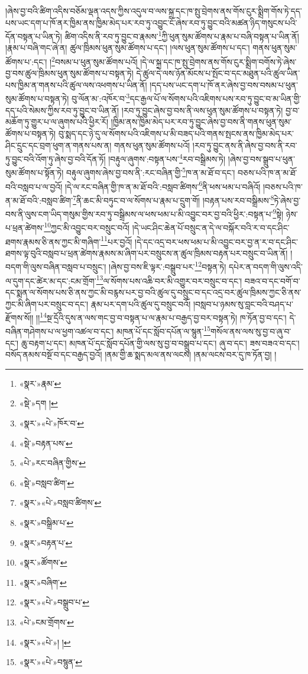 །ཞེས་བྱ་བའི་ཚིག་འདིས་བཅོམ་ལྡན་འདས་ཀྱིས་འདུལ་བ་ལས་སྐྲ་དང་ཁ་སྤུ་བྲེགས་ནས་གོས་ངུར་སྨྲིག་གོས་ཏེ་དད་པས་ཡང་དག་པ་ཁོ་ནར་ཁྱིམ་ནས་ཁྱིམ་མེད་པར་རབ་ཏུ་འབྱུང་ངོ་ཞེས་རབ་ཏུ་བྱུང་བའི་མཚན་ཉིད་གསུངས་པའི་དོན་བསྟན་པ་ཡིན་ཏེ། ཚིག་འདིས་ནི་རབ་ཏུ་བྱུང་བ་རྣམས་\footnote{«སྣར་»རྣམ་}ཀྱི་ཕུན་སུམ་ཚོགས་པ་རྣམ་པ་བཞི་བསྟན་པ་ཡིན་ནོ། །རྣམ་པ་བཞི་གང་ཞེ་ན། ཚུལ་ཁྲིམས་ཕུན་སུམ་ཚོགས་པ་དང་། །ལས་ཕུན་སུམ་ཚོགས་པ་དང་། གནས་ཕུན་སུམ་ཚོགས་པ་:དང་། །\footnote{«སྡེ་»དག །}བསམ་པ་ཕུན་སུམ་ཚོགས་པའོ། །དེ་ལ་སྐྲ་དང་ཁ་སྤུ་བྲེགས་ནས་གོས་ངུར་སྨྲིག་བགོས་ཏེ་ཞེས་བྱ་བས་ཚུལ་ཁྲིམས་ཕུན་སུམ་ཚོགས་པ་བསྟན་ཏེ། དེ་ཚུལ་དེ་ལས་ཉོན་མོངས་པ་སྤོང་བ་དང་མཐུན་པའི་ཚུལ་ཡིན་པས་ཁྱིམ་ན་གནས་པའི་ཚུལ་ལས་འཕགས་པ་ཡིན་ནོ། །དད་པས་ཡང་དག་པ་ཁོ་ནར་ཞེས་བྱ་བས་བསམ་པ་ཕུན་སུམ་ཚོགས་པ་བསྟན་ཏེ། བུ་ལོན་མ་:འཁོར་བ་\footnote{«སྣར་»«པེ་»ཁོར་བ་}དང་རྒྱལ་པོ་ལ་སོགས་པའི་འཇིགས་པས་རབ་ཏུ་བྱུང་བ་མ་ཡིན་གྱི་དད་པའི་སེམས་ཀྱིས་རབ་ཏུ་བྱུང་བ་ཡིན་ནོ། །རབ་ཏུ་བྱུང་ཞེས་བྱ་བས་ནི་ལས་ཕུན་སུམ་ཚོགས་པ་བསྟན་ཏེ། བྱ་བ་མཆོག་ཏུ་གྱུར་པ་ལ་ཞུགས་པའི་ཕྱིར་རོ། །ཁྱིམ་ནས་ཁྱིམ་མེད་པར་རབ་ཏུ་བྱུང་ཞེས་བྱ་བས་ནི་གནས་ཕུན་སུམ་ཚོགས་པ་བསྟན་ཏེ། བུ་སྨད་དང་ཉེ་དུ་ལ་སོགས་པའི་འཇིགས་པ་མི་བཟད་པའི་གནས་སྤངས་ནས་ཁྱིམ་མེད་པར་ཤིང་དྲུང་དང་བྲག་ཕུག་ན་གནས་པས་ན། གནས་ཕུན་སུམ་ཚོགས་པའོ། །རབ་ཏུ་བྱུང་ནས་ནི་ཞེས་བྱ་བས་ནི་རབ་ཏུ་བྱུང་བའི་འོག་ཏུ་ཞེས་བྱ་བའི་དོན་ཏོ། །བརྟུལ་ཞུགས་:བསྟན་པས་\footnote{«སྡེ་»བརྟན་པས་}རབ་བསྒྲིམས་ཏེ། །ཞེས་བྱ་བས་སྒྲུབ་པ་ཕུན་སུམ་ཚོགས་པ་སྟོན་ཏེ། བརྟུལ་ཞུགས་ཞེས་བྱ་བས་ནི་:རང་བཞིན་གྱི་\footnote{«པེ་»རང་བཞིན་གྱིས་}ཁ་ན་མ་ཐོ་བ་དང་། བཅས་པའི་ཁ་ན་མ་ཐོ་བའི་བསླབ་པ་ལ་བྱའོ། །དེ་ལ་རང་བཞིན་གྱི་ཁ་ན་མ་ཐོ་བའི་:བསླབ་ཚིགས་\footnote{«སྡེ་»བསླབ་ཚིག་}ནི་ཕས་ཕམ་པ་བཞིའོ། །བཅས་པའི་ཁ་ན་མ་ཐོ་བའི་:བསླབ་ཚིག་\footnote{«སྣར་»«པེ་»བསླབ་ཚིགས་}ནི་ཆང་མི་བཏུང་བ་ལ་སོགས་པ་རྣམ་པ་དྲུག་གོ། །བརྟན་པས་རབ་བསྒྲིམས་\footnote{«སྣར་»བསྒྲིམ་པ་}ཏེ་ཞེས་བྱ་བས་ནི་ལུས་ངག་ཡིད་གསུམ་གྱིས་རབ་ཏུ་བསྒྲིམས་ལ་ཕས་ཕམ་པ་མི་འབྱུང་བར་བྱ་བའི་ཕྱིར་:བསྟན་པ་\footnote{«སྣར་»བརྟན་པ་}སྟེ། ཉེས་པ་ཕྲན་ཚེགས་\footnote{«སྣར་»ཚོགས་}ཀྱང་མི་འབྱུང་བར་བསྲུང་བའོ། །དེ་ཡང་ཤིང་ཆེན་པོ་བསྲུང་ན་དེ་ལ་བསྐོར་བའི་ར་བ་དང་ཤིང་ཐགས་རྣམས་ཅི་ནས་ཀྱང་མི་གཞིག་\footnote{«སྣར་»བཞིག་}པར་བྱའོ། །དེ་དང་འདྲ་བར་ཕས་ཕམ་པ་མི་འབྱུང་བར་བྱ་ན་ར་བ་དང་ཤིང་ཐགས་ལྟ་བུའི་བསླབ་པ་ཕྲན་ཚེགས་རྣམས་མ་ཞིག་པར་བསྲུངས་ན་ཚུལ་ཁྲིམས་བརྟན་པར་བསྲུང་བ་ཡིན་ནོ། །བདག་གི་ལུས་བཞིན་བསླབ་པ་བསྲུང་། །ཞེས་བྱ་བས་ཇི་ལྟར་:བསྒྲུབ་པར་\footnote{«སྣར་»«པེ་»བསྒྲུབ་པ་}བསྟན་ཏེ། དཔེར་ན་བདག་གི་ལུས་འདི་ལ་དུག་དང་ཚེར་མ་དང་:ངམ་གྲོག་\footnote{«པེ་»ངམ་གྲོགས་}ལ་སོགས་པས་འཆི་བར་མི་འགྱུར་བར་བསྲུང་བ་དང་། བཟའ་བ་དང་བགོ་བ་དང་སྨན་ལ་སོགས་པས་ཅི་ནས་ཀྱང་མི་བརྙས་པར་བྱ་བའི་ཚུལ་དུ་བསྲུང་བ་དང་འདྲ་བར་ཚུལ་ཁྲིམས་ཀྱང་ཅི་ནས་ཀྱང་མི་ཞིག་པར་བསྲུང་བ་དང་། རྣམ་པར་དག་པའི་ཚུལ་དུ་བསྲུང་བའོ། །བསླབ་པ་ཉམས་སུ་བླང་བའི་བཤད་པ་རྫོགས་སོ།། །།\footnote{«སྣར་»«པེ་»། །}སྔ་དྲོའི་དུས་ན་ལས་གང་བྱ་བ་བསྟན་པ་ལ་རྣམ་པ་བརྒྱད་བྱ་བར་བསྟན་ཏེ། ཁ་ཏོན་བྱ་བ་དང་། དེ་བཞིན་གཤེགས་པ་ལ་ཕྱག་འཚལ་བ་དང་། མཁན་པོ་དང་སློབ་དཔོན་ལ་སྙུན་\footnote{«སྣར་»«པེ་»བསྙུན་}གསོལ་ནས་ལས་སུ་བྱ་བ་ཞུ་བ་དང་། ཆུ་བརྟག་པ་དང་། མཁན་པོ་དང་སློབ་དཔོན་གྱི་ལས་སུ་བྱ་བ་བསྒྲུབ་པ་དང་། ཞུ་བ་དང་། ཟས་བཟའ་བ་དང་། བསོད་ནམས་བསྔོ་བ་དང་བརྒྱད་བྱའོ། །ནམ་གྱི་ཆ་སྨད་མལ་ནས་ལངས། །ནམ་ལངས་བར་དུ་ཁ་ཏོན་བྱ། །
